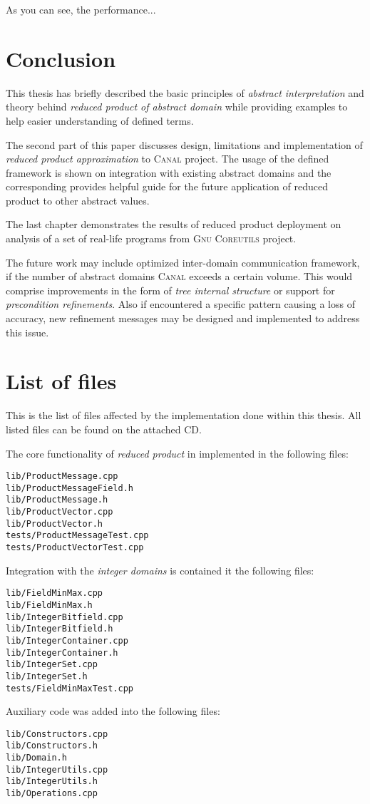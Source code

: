 \documentclass[12pt,oneside]{fithesis2}
\theoremstyle{definition}
\begin{document}
As you can see, the performance...

\chapter{Conclusion}

This thesis has briefly described the basic principles of \textit{abstract interpretation} and theory behind \textit{reduced product of abstract domain} while providing examples to help easier understanding of defined terms.

The second part of this paper discusses design, limitations and implementation of \textit{reduced product approximation} to \textsc{Canal} project. The usage of the defined framework is shown on integration with existing abstract domains and the corresponding provides helpful guide for the future application of reduced product to other abstract values.

The last chapter demonstrates the results of reduced product deployment on analysis of a set of real-life programs from \textsc{Gnu Coreutils} project.

The future work may include optimized inter-domain communication framework, if the number of abstract domains \textsc{Canal} exceeds a certain volume. This would comprise improvements in the form of \textit{tree internal structure} or support for \textit{precondition refinements}. Also if encountered a specific pattern causing a loss of accuracy, new refinement messages may be designed and implemented to address this issue.




\appendix
\chapter{List of files}

This is the list of files affected by the implementation done within this thesis. All listed files can be found on the attached CD.

The core functionality of \textit{reduced product} in implemented in the following files:

\begin{verbatim}
lib/ProductMessage.cpp
lib/ProductMessageField.h
lib/ProductMessage.h
lib/ProductVector.cpp
lib/ProductVector.h
tests/ProductMessageTest.cpp
tests/ProductVectorTest.cpp
\end{verbatim}

Integration with the \textit{integer domains} is contained it the following  files:

\begin{verbatim}
lib/FieldMinMax.cpp
lib/FieldMinMax.h
lib/IntegerBitfield.cpp
lib/IntegerBitfield.h
lib/IntegerContainer.cpp
lib/IntegerContainer.h
lib/IntegerSet.cpp
lib/IntegerSet.h
tests/FieldMinMaxTest.cpp
\end{verbatim}

Auxiliary code was added into the following files:

\begin{verbatim}
lib/Constructors.cpp
lib/Constructors.h
lib/Domain.h
lib/IntegerUtils.cpp
lib/IntegerUtils.h
lib/Operations.cpp
\end{verbatim}
\end{document}
